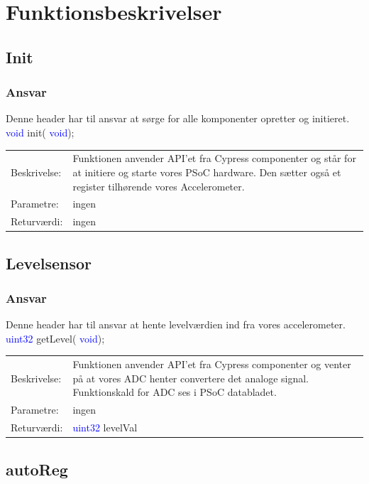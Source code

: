 \section{Funktionsbeskrivelser}
\subsection{Init}
\subsubsection{Ansvar}
Denne header har til ansvar at sørge for alle komponenter opretter og initieret.
\textcolor{blue}{void} init( \textcolor{blue}{void}); 
\begin{table}[H]
\begin{tabular}{l p{12.5cm}}
\hline
Beskrivelse:& Funktionen anvender API'et fra Cypress componenter og står for at initiere og starte vores PSoC hardware. Den sætter også et register tilhørende vores Accelerometer. \\
Parametre:&ingen\\
Returværdi:&ingen\\
\end{tabular}
\end{table}
\subsection{Levelsensor}
\subsubsection{Ansvar}
Denne header har til ansvar at hente levelværdien ind fra vores accelerometer.
\textcolor{blue}{uint32} getLevel( \textcolor{blue}{void}); 
\begin{table}[H]
\begin{tabular}{l p{12.5cm}}
\hline
Beskrivelse:& Funktionen anvender API'et fra Cypress componenter og venter på at vores ADC henter convertere det analoge signal. Funktionskald for ADC ses i PSoC databladet. \\
Parametre:&ingen\\
Returværdi:&\textcolor{blue}{uint32} levelVal\\
\end{tabular}
\end{table}

\subsection{autoReg}
